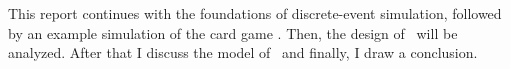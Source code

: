 This report continues with the foundations of discrete-event simulation, followed by an example simulation of the card game \uno. Then, the design of \uno\ will be analyzed. After that I discuss the model of \uno\ and finally, I draw a conclusion.








